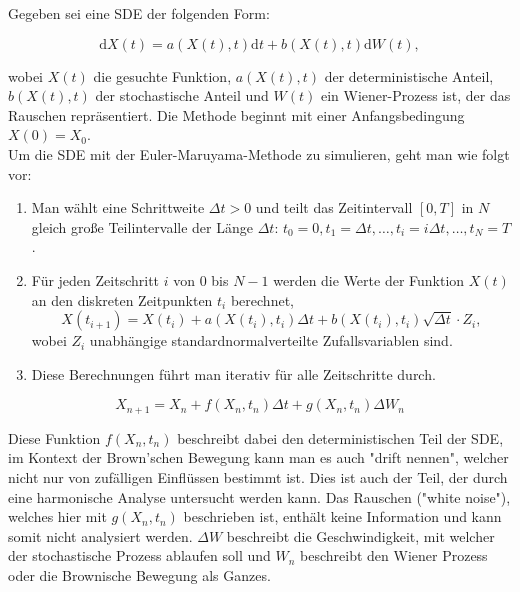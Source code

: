 Gegeben sei eine SDE der folgenden Form:

\begin{equation}
	\mathrm{d}X(t) = a(X(t), t) \mathrm{d}t + b(X(t), t) \mathrm{d}W(t),
\end{equation}

wobei $X(t)$ die gesuchte Funktion, $a(X(t), t)$ der deterministische Anteil, $b(X(t), t)$ der stochastische Anteil und $W(t)$ ein Wiener-Prozess ist, der das Rauschen repräsentiert. Die Methode beginnt mit einer Anfangsbedingung $X(0) = X_0$.\\


Um die SDE mit der Euler-Maruyama-Methode zu simulieren, geht man wie folgt vor:

\begin{enumerate}
	\item Man wählt eine Schrittweite $\Delta t > 0$ und teilt das Zeitintervall $[0, T]$ in $N$ gleich große Teilintervalle der Länge $\Delta t$: $t_0 = 0, t_1 = \Delta t, \dots, t_i = i\Delta t, \dots, t_N = T$.
	\item Für jeden Zeitschritt $i$ von $0$ bis $N-1$ werden die Werte der Funktion $X(t)$ an den diskreten Zeitpunkten $t_i$ berechnet,
	\begin{equation}
		X(t_{i+1}) = X(t_i) + a(X(t_i), t_i) \Delta t + b(X(t_i), t_i) \sqrt{\Delta t} \cdot Z_i,
	\end{equation}
	wobei $Z_i$ unabhängige standardnormalverteilte Zufallsvariablen sind.
	\item Diese Berechnungen führt man iterativ für alle Zeitschritte durch.
\end{enumerate}

\begin{equation}
	X_{n+1} = X_n + f(X_n,t_n) \Delta t + g(X_n,t_n) \Delta W_n
\end{equation}

Diese Funktion $ f(X_n,t_n) $ beschreibt dabei den deterministischen Teil der SDE, im Kontext der Brown'schen Bewegung kann man es auch "drift nennen", welcher nicht nur von zufälligen Einflüssen bestimmt ist. Dies ist auch der Teil, der durch eine harmonische Analyse untersucht werden kann. Das Rauschen ("white noise"), welches hier mit $ g(X_n,t_n) $ beschrieben ist, enthält keine Information und kann somit nicht analysiert werden. $ \Delta W $ beschreibt die Geschwindigkeit, mit welcher der stochastische Prozess ablaufen soll und $ W_n $  beschreibt den Wiener Prozess oder die Brownische Bewegung als Ganzes.\\


